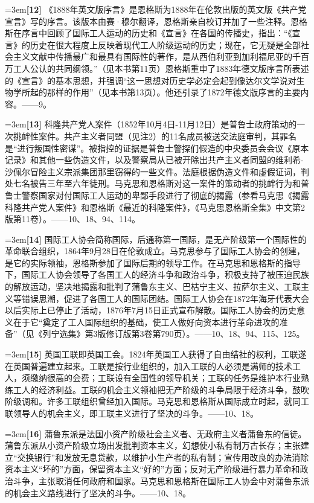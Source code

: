 \documentclass[UTF8,zihao=-4,a4paper]{ctexart}
\begin{document}
\noindent\hangindent=3em\textbf{[12]} 《1888年英文版序言》是恩格斯为1888年在伦敦出版的英文版《共产党宣言》写的序言。该版本由赛·穆尔翻译，恩格斯亲自校订并加了一些注释。恩格斯在序言中回顾了国际工人运动的历史和《宣言》在各国的传播史，指出：“《宣言》的历史在很大程度上反映着现代工人阶级运动的历史；现在，它无疑是全部社会主义文献中传播最广和最具有国际性的著作，是从西伯利亚到加利福尼亚的千百万工人公认的共同纲领。”（见本书第11页）恩格斯重申了1883年德文版序言所表述的《宣言》的基本思想，并强调“这一思想对历史学必定会起到像达尔文学说对生物学所起的那样的作用”（见本书第13页）。他还引录了1872年德文版序言的主要内容。——9。\par
\noindent\hangindent=3em\textbf{[13]} 科隆共产党人案件（1852年10月4日-11月12日）是普鲁士政府策动的一次挑衅性案件。共产主义者同盟（见注2）的11名成员被送交法庭审判，其罪名是“进行叛国性密谋”。被指控的证据是普鲁士警探们假造的中央委员会会议《原本记录》和其他一些伪造文件，以及警察局从已被开除出共产主义者同盟的维利希-沙佩尔冒险主义宗派集团那里窃得的一些文件。法庭根据伪造文件和虚假证词，判处七名被告三年至六年徒刑。马克思和恩格斯对这一案件的策动者的挑衅行为和普鲁士警察国家对付国际工人运动的卑鄙手段进行了彻底的揭露（参看马克思《揭露科隆共产党人案件》和恩格斯《最近的科隆案件》，《马克思恩格斯全集》中文第2版第11卷）。——10、18、94、114。\par
\noindent\hangindent=3em\textbf{[14]} 国际工人协会简称国际，后通称第一国际，是无产阶级第一个国际性的革命联合组织，1864年9月28日在伦敦成立。马克思参与了国际工人协会的创建，是它的实际领袖，恩格斯参加了国际后期的领导工作。在马克思和恩格斯的指导下，国际工人协会领导了各国工人的经济斗争和政治斗争，积极支持了被压迫民族的解放运动，坚决地揭露和批判了蒲鲁东主义、巴枯宁主义、拉萨尔主义、工联主义等错误思潮，促进了各国工人的国际团结。国际工人协会在1872年海牙代表大会以后实际上已停止了活动，1876年7月15日正式宣布解散。国际工人协会的历史意义在于它“奠定了工人国际组织的基础，使工人做好向资本进行革命进攻的准备”（见《列宁选集》第3版修订版第3卷第790页）。——10、18、94、115、125。\par
\noindent\hangindent=3em\textbf{[15]} 英国工联即英国工会。1824年英国工人获得了自由结社的权利，工联遂在英国普遍建立起来。工联是按行业组织的，加入工联的人必须是满师的技术工人，须缴纳很高的会费；工联设有全国性的领导机关；工联的任务是维护本行业熟练工人的经济利益。工联的机会主义领袖把无产阶级的斗争局限于经济斗争，鼓吹阶级调和。许多工联组织曾经加入国际。马克思和恩格斯从国际成立时起，就同工联领导人的机会主义，即工联主义进行了坚决的斗争。——10、18。\par
\noindent\hangindent=3em\textbf{[16]} 蒲鲁东派是法国小资产阶级社会主义者、无政府主义者蒲鲁东的信徒。蒲鲁东派从小资产阶级立场出发批判资本主义，幻想使小私有制万古长存；主张建立“交换银行”和发放无息贷款，以维护小生产者的私有制；宣传用改良的办法消除资本主义“坏的”方面，保留资本主义“好的”方面；反对无产阶级进行暴力革命和政治斗争，主张取消任何政府和国家。马克思和恩格斯在国际工人协会中对蒲鲁东派的机会主义路线进行了坚决的斗争。——10、18。\par
\end{document}
